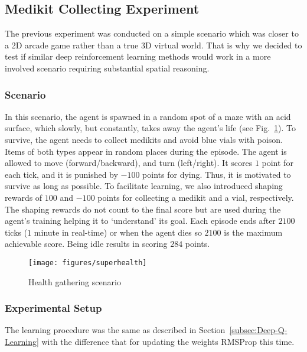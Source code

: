 \documentclass[english,american,conference, balance]{IEEEtran}
\begin{document}


\subsection{Medikit Collecting Experiment}

The previous experiment was conducted on a simple scenario which was
closer to a 2D arcade game rather than a true 3D virtual world. That
is why we decided to test if similar deep reinforcement learning methods
would work in a more involved scenario requiring substantial spatial
reasoning.

\subsubsection{Scenario}

In this scenario, the agent is spawned in a random spot of a maze
with an acid surface, which slowly, but constantly, takes away the
agent's life (see Fig.~\ref{fig:superhealth}). To survive, the agent
needs to collect medikits and avoid blue vials with poison. Items
of both types appear in random places during the episode. The agent
is allowed to move (forward/backward), and turn (left/right). It scores
$1$ point for each tick, and it is punished by $-100$ points for
dying. Thus, it is motivated to survive as long as possible. To facilitate
learning, we also introduced shaping rewards of $100$ and $-100$
points for collecting a medikit and a vial, respectively. The shaping
rewards do not count to the final score but are used during the agent's
training helping it to `understand' its goal. Each episode ends after
$2100$ ticks ($1$ minute in real-time) or when the agent dies so
$2100$ is the maximum achievable score. Being idle results in scoring
$284$ points.

\begin{figure}
\begin{centering}
\texttt{[image: figures/superhealth]}
\par\end{centering}
\caption{\label{fig:superhealth}Health gathering scenario}
\end{figure}


\subsubsection{Experimental Setup}

The learning procedure was the same as described in Section~\ref{subsec:Deep-Q-Learning}
with the difference that for updating the weights RMSProp \cite{Tieleman2012}
this time.
\end{document}

